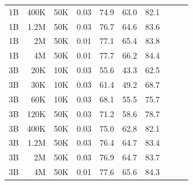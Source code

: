 \begin{table}[h]
\begin{tabulary}{1.0\textwidth}{l r c c c c c c c c}
1B    & 400K  & 50K   & 0.03 & 74.9 & 63.0 & 82.1 \\
1B    & 1.2M  & 50K   & 0.03 & 76.7 & 64.6 & 83.6 \\
1B    & 2M    & 50K   & 0.01 & 77.1 & 65.4 & 83.8 \\
1B    & 4M    & 50K   & 0.01 & 77.7 & 66.2 & 84.4 \\
\midrule[0.25pt]
3B    & 20K   & 10K   & 0.03 & 55.6 & 43.3 & 62.5 \\
3B    & 30K   & 10K   & 0.03 & 61.4 & 49.2 & 68.7 \\
3B    & 60K   & 10K   & 0.03 & 68.1 & 55.5 & 75.7 \\
3B    & 120K  & 50K   & 0.03 & 71.2 & 58.6 & 78.7 \\
3B    & 400K  & 50K   & 0.03 & 75.0 & 62.8 & 82.1 \\
3B    & 1.2M  & 50K   & 0.03 & 76.4 & 64.7 & 83.4 \\
3B    & 2M    & 50K   & 0.03 & 76.9 & 64.7 & 83.7 \\
3B    & 4M    & 50K   & 0.01 & 77.6 & 65.6 & 84.3 \\
    \bottomrule
  \end{tabulary}
\end{table}



